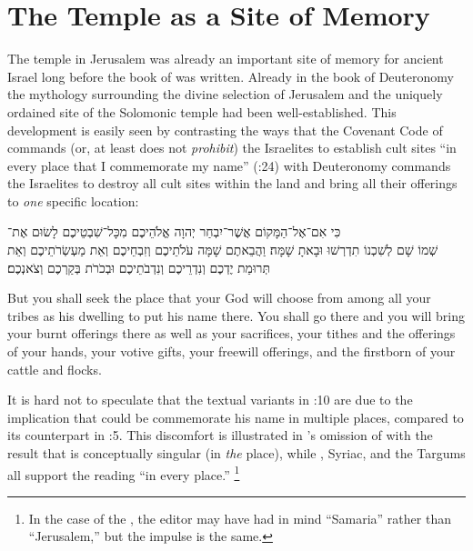 \section{The Temple as a Site of Memory}
The temple in Jerusalem was already an important site of memory for ancient Israel long before the book of \chronicles was written. Already in the book of Deuteronomy the mythology surrounding the divine selection of Jerusalem and the uniquely ordained site of the Solomonic temple had been well-established. This development is easily seen by contrasting the ways that the Covenant Code of  commands (or, at least does not \emph{prohibit}) the Israelites to establish cult sites  ``in every place that I commemorate my name'' (:24) with Deuteronomy commands the Israelites to destroy all cult sites within the land and bring all their offerings to \emph{one} specific location: 
\begin{hebrewtext}
    כִּי אִם־אֶל־הַמָּקוֹם אֲשֶׁר־יִבְחַר יְהוָה אֱלֹהֵיכֶם מִכָּל־שִׁבְטֵיכֶם לָשׂוּם אֶת־\\שְׁמוֹ שָׁם לְשִׁכְנוֹ תִדְרְשׁוּ וּבָאתָ שָׁמָּה׃
    וַהֲבֵאתֶם שָׁמָּה עֹלֹתֵיכֶם וְזִבְחֵיכֶם וְאֵת מַעְשְׂרֹתֵיכֶם וְאֵת תְּרוּמַת יֶדְכֶם וְנִדְרֵיכֶם וְנִדְבֹתֵיכֶם וּבְכֹרֹת בְּקַרְכֶם וְצֹאנְכֶם׃
\end{hebrewtext}
\begin{translation}
    But you shall seek the place that \yahweh your God will choose from among all your tribes as his dwelling to put his name there. You shall go there
    and you will bring your burnt offerings there as well as your sacrifices, your tithes and the offerings of your hands, your votive gifts, your freewill offerings, and the firstborn of your cattle and flocks. 
\end{translation}
\noindent
It is hard not to speculate that the textual variants in :10 are due to the implication that \yahweh could be commemorate his name in multiple places, compared to its counterpart in :5. This discomfort is illustrated in  \sampent's omission of  with the result that  is conceptually singular (in \emph{the} place), while \lxx, Syriac, and the Targums all support the reading ``in every place.''%
    \footnote{In the case of the \sampent, the editor may have had in mind ``Samaria'' rather than ``Jerusalem,'' but the impulse is the same.}
